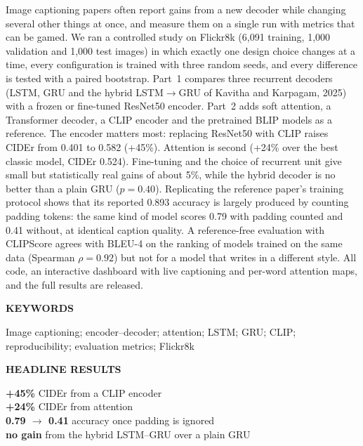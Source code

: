 \documentclass[11pt]{article}
\begin{document}
{\begin{minipage}[t]{0.735\textwidth}
{\begin{minipage}[t]{\dimexpr\linewidth-2\fboxsep-2.5pt}
{\sffamily\fontsize{9.4}{12.4}\selectfont\justifying\noindent Image captioning papers often report gains from a new decoder while changing several other things at once, and measure them on a single run with metrics that can be gamed. We ran a controlled study on Flickr8k (6,091 training, 1,000 validation and 1,000 test images) in which exactly one design choice changes at a time, every configuration is trained with three random seeds, and every difference is tested with a paired bootstrap. Part~1 compares three recurrent decoders (LSTM, GRU and the hybrid LSTM$\rightarrow$GRU of Kavitha and Karpagam, 2025) with a frozen or fine-tuned ResNet50 encoder. Part~2 adds soft attention, a Transformer decoder, a CLIP encoder and the pretrained BLIP models as a reference. The encoder matters most: replacing ResNet50 with CLIP raises CIDEr from 0.401 to 0.582 (+45\%). Attention is second (+24\% over the best classic model, CIDEr 0.524). Fine-tuning and the choice of recurrent unit give small but statistically real gains of about 5\%, while the hybrid decoder is no better than a plain GRU ($p=0.40$). Replicating the reference paper's training protocol shows that its reported 0.893 accuracy is largely produced by counting padding tokens: the same kind of model scores 0.79 with padding counted and 0.41 without, at identical caption quality. A reference-free evaluation with CLIPScore agrees with BLEU-4 on the ranking of models trained on the same data (Spearman $\rho=0.92$) but not for a model that writes in a different style. All code, an interactive dashboard with live captioning and per-word attention maps, and the full results are released.\par}\vspace{8pt}
\end{minipage}}
\end{minipage}\hfill
\begin{minipage}[t]{0.235\textwidth}\sffamily\raggedright\vspace{6pt}
{\bfseries\footnotesize\color{tfred}KEYWORDS}\par\vspace{1pt}
{\fontsize{8.6}{11}\selectfont Image captioning; encoder--decoder; attention; LSTM; GRU; CLIP; reproducibility; evaluation metrics; Flickr8k\par}
\vspace{9pt}
{\bfseries\footnotesize\color{tfred}HEADLINE RESULTS}\par\vspace{2pt}
{\fontsize{8.2}{10.6}\selectfont
\textcolor{tfred}{\bfseries +45\%} CIDEr from a CLIP encoder\\
\textcolor{tfred}{\bfseries +24\%} CIDEr from attention\\
\textcolor{tfred}{\bfseries 0.79 $\rightarrow$ 0.41} accuracy once padding is ignored\\
\textcolor{tfgrey}{\bfseries no gain} from the hybrid LSTM--GRU over a plain GRU\par}
\end{minipage}
\vspace{18pt}
}
\end{document}
